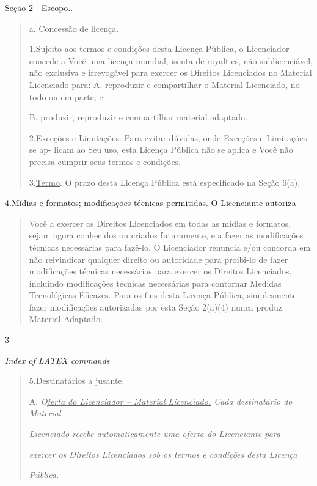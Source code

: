 \documentclass[
]{article}
\begin{document}
Seção 2 - Escopo..

\begin{quote}
a. Concessão de licença.

1.Sujeito aos termos e condições desta Licença Pública, o Licenciador
concede a Você uma licença mundial, isenta de royalties, não
sublicenciável, não exclusiva e irrevogável para exercer os Direitos
Licenciados no Material Licenciado para: A. reproduzir e compartilhar o
Material Licenciado, no todo ou em parte; e

B. produzir, reproduzir e compartilhar material adaptado.

2.Exceções e Limitações. Para evitar dúvidas, onde Exceções e Limitações
se ap- licam ao Seu uso, esta Licença Pública não se aplica e Você não
precisa cumprir seus termos e condições.

3.\uline{Termo}. O prazo desta Licença Pública está especificado na
Seção 6(a).
\end{quote}

4.Mídias e formatos; modificações técnicas permitidas. O Licenciante
autoriza

\begin{quote}
Você a exercer os Direitos Licenciados em todas as mídias e formatos,
sejam agora conhecidos ou criados futuramente, e a fazer as modificações
técnicas necessárias para fazê-lo. O Licenciador renuncia e/ou concorda
em não reivindicar qualquer direito ou autoridade para proibi-lo de
fazer modificações técnicas necessárias para exercer os Direitos
Licenciados, incluindo modificações técnicas necessárias para contornar
Medidas Tecnológicas Eficazes. Para os fins desta Licença Pública,
simplesmente fazer modificações autorizadas por esta Seção 2(a)(4) nunca
produz Material Adaptado.
\end{quote}

3

\emph{Index of LATEX commands}

\begin{quote}
5.\uline{Destinatários a jusante}.

A. \emph{O\uline{ferta do Licenciador -- Material Licenciado.} Cada
destinatário do Material}

\emph{Licenciado recebe automaticamente uma oferta do Licenciante para}

\emph{exercer os Direitos Licenciados sob os termos e condições desta
Licença}

\emph{Pública.}
\end{quote}
\end{document}
